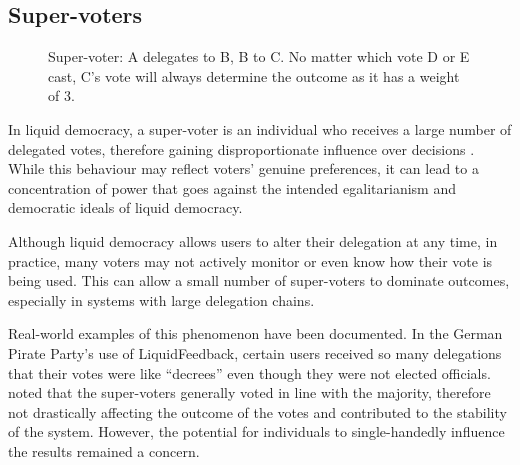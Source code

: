 \subsection*{Super-voters}
\begin{figure}[h]
    \centering
    \caption{Super-voter: A delegates to B, B to C. No matter which vote D or E cast, C's vote will always determine the outcome as it has a weight of 3.}
    \label{fig:delegation-supervoter}
\end{figure}
In liquid democracy, a super-voter is an individual who receives a large number of delegated votes, therefore gaining disproportionate influence over decisions \citep{kling2015votingbehaviourpoweronline}. While this behaviour may reflect voters' genuine preferences, it can lead to a concentration of power that goes against the intended egalitarianism and democratic ideals of liquid democracy.

Although liquid democracy allows users to alter their delegation at any time, in practice, many voters may not actively monitor or even know how their vote is being used. This can allow a small number of super-voters to dominate outcomes, especially in systems with large delegation chains.

Real-world examples of this phenomenon have been documented. In the German Pirate Party's use of LiquidFeedback, certain users received so many delegations that their votes were like ``decrees'' \citep{sven_becker_liquid_2012,kling2015votingbehaviourpoweronline} even though they were not elected officials. \cite{kling2015votingbehaviourpoweronline} noted that the super-voters generally voted in line with the majority, therefore not drastically affecting the outcome of the votes and contributed to the stability of the system. However, the potential for individuals to single-handedly influence the results remained a concern.


